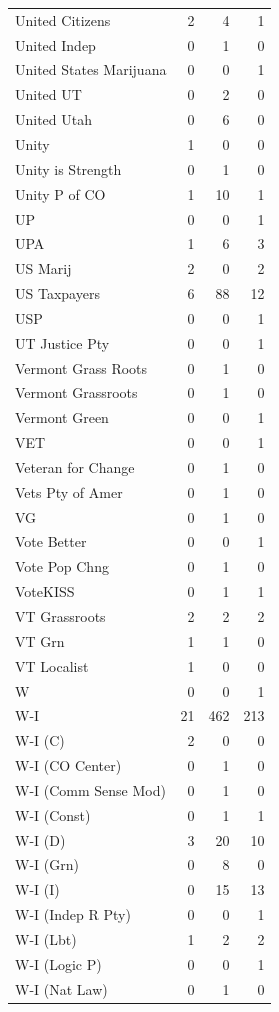 \begin{supertabular}{lrrr}
United Citizens & 2 & 4 & 1\\
United Indep & 0 & 1 & 0\\
United States Marijuana & 0 & 0 & 1\\
United UT & 0 & 2 & 0\\
United Utah & 0 & 6 & 0\\
Unity & 1 & 0 & 0\\
Unity is Strength & 0 & 1 & 0\\
Unity P of CO & 1 & 10 & 1\\
UP & 0 & 0 & 1\\
UPA & 1 & 6 & 3\\
US Marij & 2 & 0 & 2\\
US Taxpayers & 6 & 88 & 12\\
USP & 0 & 0 & 1\\
UT Justice Pty & 0 & 0 & 1\\
Vermont Grass Roots & 0 & 1 & 0\\
Vermont Grassroots & 0 & 1 & 0\\
Vermont Green & 0 & 0 & 1\\
VET & 0 & 0 & 1\\
Veteran for Change & 0 & 1 & 0\\
Vets Pty of Amer & 0 & 1 & 0\\
VG & 0 & 1 & 0\\
Vote Better & 0 & 0 & 1\\
Vote Pop Chng & 0 & 1 & 0\\
VoteKISS & 0 & 1 & 1\\
VT Grassroots & 2 & 2 & 2\\
VT Grn & 1 & 1 & 0\\
VT Localist & 1 & 0 & 0\\
W & 0 & 0 & 1\\
W-I & 21 & 462 & 213\\
W-I (C) & 2 & 0 & 0\\
W-I (CO Center) & 0 & 1 & 0\\
W-I (Comm Sense Mod) & 0 & 1 & 0\\
W-I (Const) & 0 & 1 & 1\\
W-I (D) & 3 & 20 & 10\\
W-I (Grn) & 0 & 8 & 0\\
W-I (I) & 0 & 15 & 13\\
W-I (Indep R Pty) & 0 & 0 & 1\\
W-I (Lbt) & 1 & 2 & 2\\
W-I (Logic P) & 0 & 0 & 1\\
W-I (Nat Law) & 0 & 1 & 0\\

\end{supertabular}
